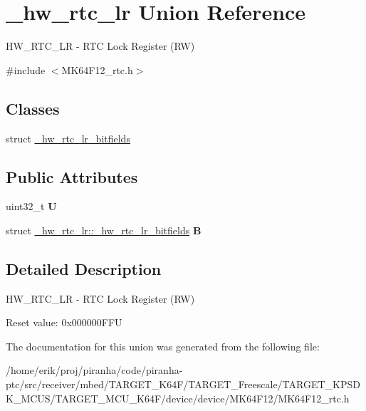 \hypertarget{union__hw__rtc__lr}{}\section{\+\_\+hw\+\_\+rtc\+\_\+lr Union Reference}
\label{union__hw__rtc__lr}


H\+W\+\_\+\+R\+T\+C\+\_\+\+LR -\/ R\+TC Lock Register (RW)  




{\ttfamily \#include $<$M\+K64\+F12\+\_\+rtc.\+h$>$}

\subsection*{Classes}
\begin{DoxyCompactItemize}
\item 
struct \hyperlink{struct__hw__rtc__lr_1_1__hw__rtc__lr__bitfields}{\+\_\+hw\+\_\+rtc\+\_\+lr\+\_\+bitfields}
\end{DoxyCompactItemize}
\subsection*{Public Attributes}
\begin{DoxyCompactItemize}
\item 
uint32\+\_\+t {\bfseries U}\hypertarget{union__hw__rtc__lr_a6e855a59e2e572dc37a061ad5fd2e5a2}{}\label{union__hw__rtc__lr_a6e855a59e2e572dc37a061ad5fd2e5a2}

\item 
struct \hyperlink{struct__hw__rtc__lr_1_1__hw__rtc__lr__bitfields}{\+\_\+hw\+\_\+rtc\+\_\+lr\+::\+\_\+hw\+\_\+rtc\+\_\+lr\+\_\+bitfields} {\bfseries B}\hypertarget{union__hw__rtc__lr_a5396d1f142ee7a7ed7db2233a7cdc243}{}\label{union__hw__rtc__lr_a5396d1f142ee7a7ed7db2233a7cdc243}

\end{DoxyCompactItemize}


\subsection{Detailed Description}
H\+W\+\_\+\+R\+T\+C\+\_\+\+LR -\/ R\+TC Lock Register (RW) 

Reset value\+: 0x000000\+F\+FU 

The documentation for this union was generated from the following file\+:\begin{DoxyCompactItemize}
\item 
/home/erik/proj/piranha/code/piranha-\/ptc/src/receiver/mbed/\+T\+A\+R\+G\+E\+T\+\_\+\+K64\+F/\+T\+A\+R\+G\+E\+T\+\_\+\+Freescale/\+T\+A\+R\+G\+E\+T\+\_\+\+K\+P\+S\+D\+K\+\_\+\+M\+C\+U\+S/\+T\+A\+R\+G\+E\+T\+\_\+\+M\+C\+U\+\_\+\+K64\+F/device/device/\+M\+K64\+F12/M\+K64\+F12\+\_\+rtc.\+h\end{DoxyCompactItemize}
